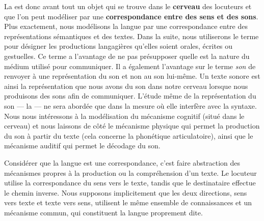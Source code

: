 La  est donc avant tout un objet qui se trouve dans le \textbf{cerveau} des locuteurs et que l’on peut modéliser par une \textbf{correspondance entre des sens et des sons}. Plus exactement, nous modélisons la langue par une correspondance entre des représentations sémantiques et des textes. Dans la suite, nous utiliserons le terme  pour désigner les productions langagières qu’elles soient orales, écrites ou gestuelles. Ce terme a l’avantage de ne pas présupposer quelle est la nature du médium utilisé pour communiquer. Il a également l’avantage sur le terme \textit{son} de renvoyer à une représentation du son et non au son lui-même. Un texte sonore est ainsi la représentation que nous avons du son dans notre cerveau lorsque nous produisons des sons afin de communiquer. L’étude même de la représentation du son — la  — ne sera abordée que dans la mesure où elle interfère avec la syntaxe. Nous nous intéressons à la modélisation du mécanisme cognitif (situé dans le cerveau) et nous laissons de côté le mécanisme physique qui permet la production du son à partir du texte (cela concerne la phonétique articulatoire), ainsi que le mécanisme auditif qui permet le décodage du son.

Considérer que la langue est une correspondance, c’est faire abstraction des mécanismes propres à la production ou la compréhension d’un texte. Le locuteur utilise la correspondance du sens vers le texte, tandis que le destinataire effectue le chemin inverse. Nous supposons implicitement que les deux directions, sens vers texte et texte vers sens, utilisent le même ensemble de connaissances et un mécanisme commun, qui constituent la langue proprement dite.


